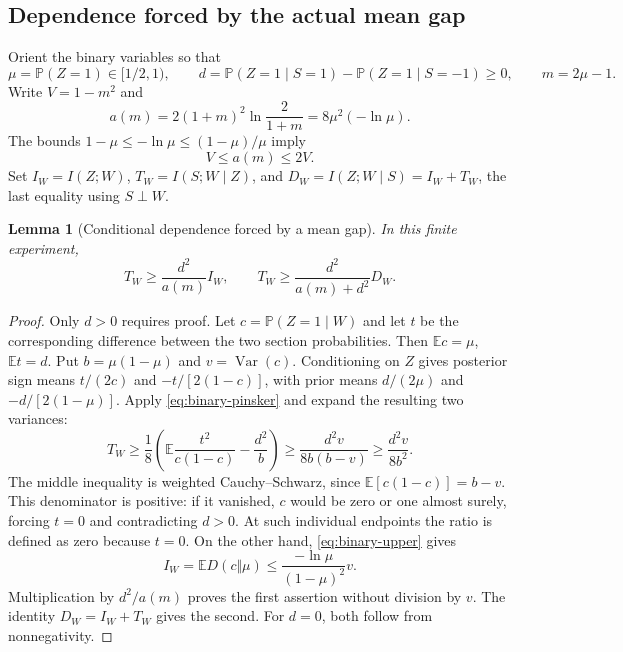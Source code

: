 \documentclass[11pt]{article}
\newtheorem{lemma}[theorem]{Lemma}
\theoremstyle{remark}\newtheorem{remark}[theorem]{Remark}
\newcommand{\E}{\mathbb E}\newcommand{\PP}{\mathbb P}\newcommand{\dd}{\,\mathrm d}
\numberwithin{equation}{section}
\begin{document}
\subsection{Dependence forced by the actual mean gap}
Orient the binary variables so that
\[
 \mu=\PP(Z=1)\in[1/2,1),\qquad
 d=\PP(Z=1\mid S=1)-\PP(Z=1\mid S=-1)\ge0,
 \qquad m=2\mu-1.
\]
Write $V=1-m^2$ and
\begin{equation}\label{eq:a}
 a(m)=2(1+m)^2\ln\frac2{1+m}=8\mu^2(-\ln\mu).
\end{equation}
The bounds $1-\mu\le-\ln\mu\le(1-\mu)/\mu$ imply
\begin{equation}\label{eq:a-bounds}
 V\le a(m)\le2V.
\end{equation}
Set $I_W=I(Z;W)$, $T_W=I(S;W\mid Z)$, and
$D_W=I(Z;W\mid S)=I_W+T_W$, the last equality using $S\perp W$.

\begin{lemma}[Conditional dependence forced by a mean gap]\label{lem:dependence}
In this finite experiment,
\begin{equation}\label{eq:privacy-ratio}
 T_W\ge\frac{d^2}{a(m)}I_W,
 \qquad
 T_W\ge\frac{d^2}{a(m)+d^2}D_W.
\end{equation}
\end{lemma}
\begin{proof}
Only $d>0$ requires proof. Let $c=\PP(Z=1\mid W)$ and let $t$ be the
corresponding difference between the two section probabilities. Then
$\E c=\mu$, $\E t=d$. Put $b=\mu(1-\mu)$ and $v=\operatorname{Var}(c)$.
Conditioning on $Z$ gives posterior sign means $t/(2c)$ and
$-t/[2(1-c)]$, with prior means $d/(2\mu)$ and $-d/[2(1-\mu)]$.
Apply \eqref{eq:binary-pinsker} and expand the resulting two variances:
\[
 T_W\ge\frac18\left(\E\frac{t^2}{c(1-c)}-\frac{d^2}{b}\right)
 \ge\frac{d^2v}{8b(b-v)}\ge\frac{d^2v}{8b^2}.
\]
The middle inequality is weighted Cauchy--Schwarz, since
$\E[c(1-c)]=b-v$. This denominator is positive: if it vanished, $c$ would
be zero or one almost surely, forcing $t=0$ and contradicting $d>0$.
At such individual endpoints the ratio is defined as zero because $t=0$.
On the other hand, \eqref{eq:binary-upper} gives
\[
 I_W=\E D(c\Vert\mu)\le\frac{-\ln\mu}{(1-\mu)^2}v.
\]
Multiplication by $d^2/a(m)$ proves the first assertion without division by
$v$. The identity $D_W=I_W+T_W$ gives the second. For $d=0$, both follow
from nonnegativity.
\end{proof}
\end{document}
